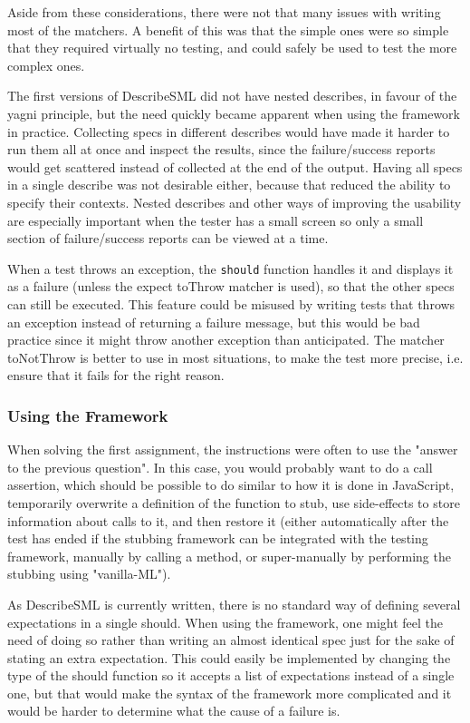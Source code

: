 \documentclass[11pt]{article}
\begin{document}
Aside from these considerations, there were not that many issues with writing most of the matchers. A benefit of this was that the simple ones were so simple that they required virtually no testing, and could safely be used to test the more complex ones.

The first versions of DescribeSML did not have nested describes, in favour of the \gls{yagni} principle, but the need quickly became apparent when using the framework in practice. Collecting specs in different describes would have made it harder to run them all at once and inspect the results, since the failure/success reports would get scattered instead of collected at the end of the output. Having all specs in a single describe was not desirable either, because that reduced the ability to specify their contexts. Nested describes and other ways of improving the usability are especially important when the tester has a small screen so only a small section of failure/success reports can be viewed at a time.

When a test throws an exception, the \texttt{should} function handles it and displays it as a failure (unless the expect toThrow matcher is used), so that the other specs can still be executed. This feature could be misused by writing tests that throws an exception instead of returning a failure message, but this would be bad practice since it might throw another exception than anticipated. The matcher toNotThrow is better to use in most situations, to make the test more precise, i.e. ensure that it fails for the right reason.

\subsubsection{Using the Framework}

When solving the first assignment, the instructions were often to use the "answer to the previous question". In this case, you would probably want to do a call assertion, which should be possible to do similar to how it is done in JavaScript, temporarily overwrite a definition of the function to stub, use side-effects to store information about calls to it, and then restore it (either automatically after the test has ended if the stubbing framework can be integrated with the testing framework, manually by calling a method, or super-manually by performing the stubbing using "vanilla-ML").

As DescribeSML is currently written, there is no standard way of defining several expectations in a single should. When using the framework, one might feel the need of doing so rather than writing an almost identical spec just for the sake of stating an extra expectation. This could easily be implemented by changing the type of the should function so it accepts a list of expectations instead of a single one, but that would make the syntax of the framework more complicated and it would be harder to determine what the cause of a failure is.
\end{document}
